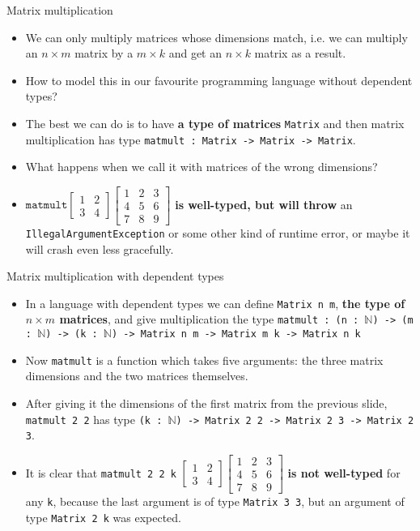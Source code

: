 \documentclass{beamer}
\newcommand{\m}[1]{\texttt{#1}}
\begin{document}
\begin{frame}{Matrix multiplication}
\begin{itemize}
	\item We can only multiply matrices whose dimensions match, i.e. we can multiply an $n \times m$ matrix by a $m \times k$ and get an $n \times k$ matrix as a result.
	\item How to model this in our favourite programming language without dependent types?
	\item The best we can do is to have \textbf{a type of matrices} \m{Matrix} and then matrix multiplication has type \m{matmult :\ Matrix -> Matrix -> Matrix}.
	\item What happens when we call it with matrices of the wrong dimensions?
	\item $\m{matmult} \begin{bmatrix}1 & 2\\3 & 4\end{bmatrix} \begin{bmatrix}1 & 2 & 3\\4 & 5 & 6\\7 & 8 & 9\end{bmatrix}$ \textbf{is well-typed, but will throw} an \m{IllegalArgumentException} or some other kind of runtime error, or maybe it will crash even less gracefully.
\end{itemize}
\end{frame}

\begin{frame}{Matrix multiplication with dependent types}
\begin{itemize}
	\item In a language with dependent types we can define \m{Matrix n m}, \textbf{the type of $n \times m$ matrices}, and give multiplication the type \m{matmult : (n :\ $\mathbb{N}$) ->  (m :\ $\mathbb{N}$) -> (k :\ $\mathbb{N}$) -> Matrix n m -> Matrix m k -> Matrix n k}
	\item Now \m{matmult} is a function which takes five arguments: the three matrix dimensions and the two matrices themselves.
	\item After giving it the dimensions of the first matrix from the previous slide, \m{matmult 2 2} has type \m{(k :\ $\mathbb{N}$) -> Matrix 2 2 -> Matrix 2 3 -> Matrix 2 3}.
	\item It is clear that \m{matmult 2 2 k} $\begin{bmatrix}1 & 2\\3 & 4\end{bmatrix} \begin{bmatrix}1 & 2 & 3\\4 & 5 & 6\\7 & 8 & 9\end{bmatrix}$ \textbf{is not well-typed} for any \m{k}, because the last argument is of type \m{Matrix 3 3}, but an argument of type \m{Matrix 2 k} was expected.
\end{itemize}
\end{frame}
\end{document}
